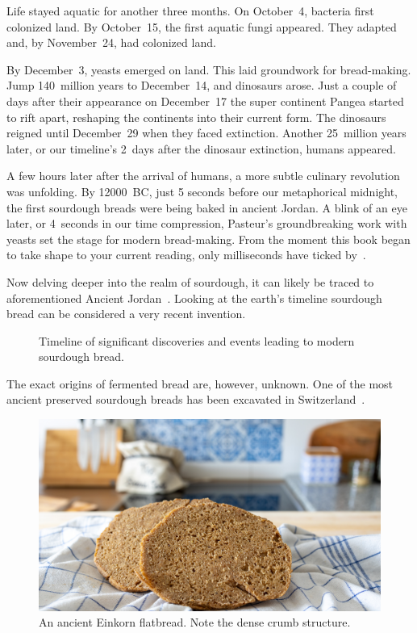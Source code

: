 Life stayed aquatic for another three months.
On October~4, bacteria first colonized land. By October~15, the
first aquatic fungi appeared. They adapted and, by November~24, had colonized
land.

By December~3, yeasts emerged on land. This laid groundwork for bread-making.
Jump 140~million years to December~14, and dinosaurs arose. Just a couple
of days after their appearance on December~17 the super continent Pangea
started to rift apart, reshaping the continents into their current form.
The dinosaurs reigned until December~29 when they faced extinction.
Another 25~million years later, or our timeline's 2~days after the dinosaur
extinction, humans appeared.

A few hours later after the arrival of humans, a more subtle culinary
revolution was unfolding. By \num{12000}~BC, just 5 seconds before our metaphorical
midnight, the first sourdough breads were being baked in ancient Jordan. A blink of
an eye later, or 4~seconds in our time compression, Pasteur's groundbreaking work
with yeasts set the stage for modern bread-making. From the moment this book
began to take shape to your current reading, only milliseconds have ticked
by~\cite{Yong+2017}.

Now delving deeper into the realm of sourdough, it can likely be traced to aforementioned
Ancient Jordan~\cite{jordan+bread}. Looking at the earth's timeline sourdough
bread can be considered a very recent invention.

\begin{figure}[!htb]
\centering
  
  \caption[Sourdough history timeline]{Timeline of significant discoveries and
  events leading to modern sourdough bread.}%
  \label{fig:sourdough-timeline}
\end{figure}

The exact origins of fermented
bread are, however, unknown. One of the most ancient preserved
sourdough breads has been excavated in Switzerland~\cite{switzerland+bread}.

\begin{figure}[ht]
  \includegraphics[width=\textwidth]{einkorn-crumb}
  \caption[Ancient Einkorn flatbread]{An ancient Einkorn flatbread. Note the
      dense crumb structure.}%
  \label{einkorn-crumb}
\end{figure}

